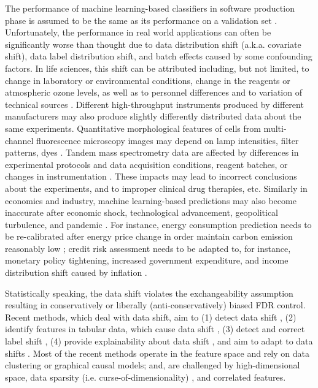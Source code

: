 \documentclass{article}
\begin{document}
The performance of machine learning-based classifiers in software production phase is assumed to be the same as its performance on a validation set  \cite{dmlsbook2022}. Unfortunately, the  performance in real world applications can often be significantly worse than thought due to data distribution shift (a.k.a. covariate shift), data label distribution shift, and batch effects \cite{Candela2009DatasetShift} caused by some confounding factors. In life sciences, this shift can be attributed including, but not limited, to change in laboratory or environmental conditions, change in the reagents or atmospheric ozone levels, as well as to personnel differences and to variation of technical sources \cite{leek2010tackling}. Different high-throughput instruments produced by different manufacturers may also produce slightly differently distributed data about the same experiments. Quantitative morphological features of cells from multi-channel fluorescence microscopy images may depend on lamp intensities, filter patterns, dyes \cite{bray2016cell}. Tandem mass spectrometry data are affected by differences in experimental protocols and data acquisition conditions, reagent batches, or changes in instrumentation \cite{phua2022perspectives, vcuklina2021diagnostics}. These impacts may lead to incorrect conclusions about the experiments, and to improper clinical drug therapies, etc. Similarly in economics and industry, machine learning-based predictions may also become inaccurate after economic shock, technological advancement, geopolitical turbulence, and pandemic \cite{ramey2016macroeconomic}. For instance, energy consumption prediction needs to be re-calibrated after energy price change in order maintain carbon emission reasonably low \cite{clement2023coping}; credit risk assessment needs to be adapted to, for instance, monetary policy tightening, increased government expenditure, and income distribution shift caused by inflation \cite{kritzman2012regime,guo2023predict, Zhang:EECS-2021-262}.



Statistically speaking, the data shift violates the exchangeability assumption resulting in conservatively or liberally (anti-conservatively) biased FDR control. 
Recent methods, which deal with data shift, aim to (1) detect data shift  \cite{ dasu2009change}, (2) identify features in tabular data, which cause data shift \cite{kulinski2020feature}, (3) detect and correct label shift \cite{lipton2018detecting}, (4) provide explainability about data shift \cite{budhathoki2021did,kulinski2023towards}, and aim to adapt to data shifts \cite{sui2024unleashing, zhang2021adaptive, zhang2022memo}. Most of the recent methods operate in the feature space and rely on data clustering or graphical causal models; and, are challenged by high-dimensional space, data sparsity (i.e. curse-of-dimensionality) \cite{donoho2000high}, and correlated features. 
\end{document}
